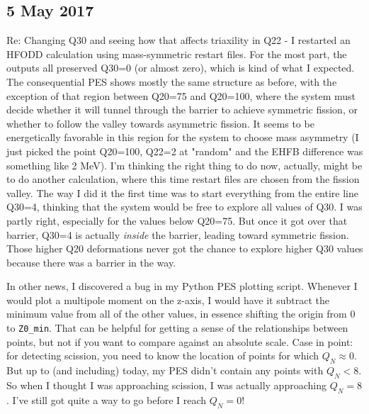 \documentclass[]{report}
\begin{document}
\subsection*{5 May 2017}
Re: Changing Q30 and seeing how that affects triaxility in Q22 - I restarted an HFODD calculation using mass-symmetric  restart files. For the most part, the outputs all preserved Q30=0 (or almost zero), which is kind of what I expected. The consequential PES shows mostly the same structure as before, with the exception of that region between Q20=75 and Q20=100, where the system must decide whether it will tunnel through the barrier to achieve symmetric fission, or whether to follow the valley towards asymmetric fission. It seems to be energetically favorable in this region for the system to choose mass asymmetry (I just picked the point Q20=100, Q22=2 at "random" and the EHFB difference was something like 2 MeV). I'm thinking the right thing to do now, actually, might be to do another calculation, where this time restart files are chosen from the fission valley. The way I did it the first time was to start everything from the entire line Q30=4, thinking that the system would be free to explore all values of Q30. I was partly right, especially for the values below Q20=75. But once it got over that barrier, Q30=4 is actually \textit{inside} the barrier, leading toward symmetric fission. Those higher Q20 deformations never got the chance to explore higher Q30 values because there was a barrier in the way.

In other news, I discovered a bug in my Python PES plotting script. Whenever I would plot a multipole moment on the z-axis, I would have it subtract the minimum value from all of the other values, in essence shifting the origin from 0 to \texttt{Z0\_min}. That can be helpful for getting a sense of the relationships between points, but not if you want to compare against an absolute scale. Case in point: for detecting scission, you need to know the location of points for which $Q_N\approx0$. But up to (and including) today, my PES didn't contain any points with $Q_N < 8$. So when I thought I was approaching scission, I was actually approaching $Q_N=8$. I've still got quite a way to go before I reach $Q_N=0$!
\end{document}
